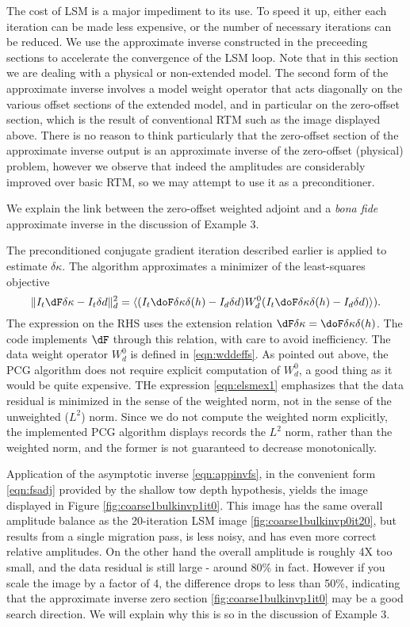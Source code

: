 The cost of LSM is a major impediment to its use. To speed it up,
either each iteration can be made less expensive, or the number of
necessary iterations can be reduced. We use the approximate
inverse constructed in the preceeding sections to accelerate the
convergence of the LSM loop. Note that in this section we are dealing
with a physical or non-extended model. The second form of the
approximate inverse  
involves a model weight operator that acts diagonally on the various
offset sections of the extended model, and in particular on the
zero-offset section, which is the result of conventional RTM such as
the image displayed above. There is no reason to think particularly
that the zero-offset section of the approximate inverse output is an
approximate inverse of the zero-offset (physical) problem, however we
observe that indeed the amplitudes are considerably
improved over basic RTM, so we may attempt to use it as a
preconditioner.

We explain the link between the zero-offset weighted adjoint and a
{\em bona fide} approximate inverse in the discussion of Example 3.

The preconditioned conjugate gradient iteration described earlier is
applied to estimate $\delta \kappa$. The algorithm approximates a
minimizer of the least-squares objective
\begin{equation}
\label{eqn:elsmex1}
\|I_t\dF \delta \kappa -I_t\delta d\|^2_d = \langle (I_t \doF \delta \kappa \delta(h) -
I_d \delta d) W_d^0 (I_t \doF \delta \kappa \delta(h)- I_d \delta d)\rangle). 
\end{equation}
The expression on the RHS uses the extension relation $\dF \delta
\kappa = \doF \delta \kappa \delta(h)$. The code implements $\dF$
through this relation, with care to avoid inefficiency. The data
weight operator $W_d^0$ is defined in \ref{eqn:wddeffs}. As pointed
out above, the PCG algorithm does not require explicit computation of
$W_d^0$, a good thing as it would be quite expensive. THe expression
\ref{eqn:elsmex1} emphasizes that the data residual is minimized in
the sense of the weighted norm, not in the sense of the unweighted
($L^2$) norm. Since we do not compute the weighted norm explicitly,
the implemented PCG algorithm displays records the $L^2$ norm, rather
than the weighted norm, and the former is not guaranteed to decrease
monotonically. 

Application of the asymptotic inverse \ref{eqn:appinvfs}, in the
convenient form \ref{eqn:fsadj} provided by the shallow tow depth hypothesis,  yields the image displayed in Figure
\ref{fig:coarse1bulkinvp1it0}. This image has the same overall
amplitude balance as the 20-iteration LSM image
\ref{fig:coarse1bulkinvp0it20}, but results from a single migration
pass, is less noisy, and has even more
correct relative amplitudes. On the other hand the overall amplitude
is roughly 4X too small, and the data residual is still large - around 80\% in
fact. However if you scale the image by a factor of 4, the difference
drops to less than 50\%, indicating that the approximate inverse
zero section \ref{fig:coarse1bulkinvp1it0} may be a good search
direction. We will explain why this is so in the discussion of Example 3.

